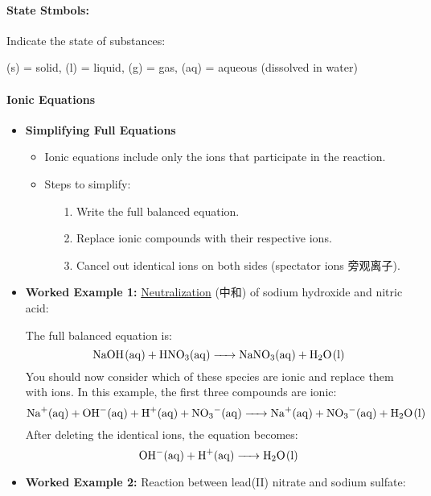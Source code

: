 \paragraph{State Stmbols:} Indicate the state of substances:
\begin{center}
    (s) = solid, (l) = liquid, (g) = gas, (aq) = aqueous (dissolved in water)
\end{center}

\paragraph{Ionic Equations}
\begin{itemize}
    \item \textbf{Simplifying Full Equations}
    \begin{itemize}
        \item Ionic equations include only the ions that participate in the reaction.
        \item Steps to simplify:
        \begin{itemize}
            \item[1.] Write the full balanced equation.
            \item[2.] Replace ionic compounds with their respective ions.
            \item[3.] Cancel out identical ions on both sides (spectator ions 旁观离子).
        \end{itemize}
    \end{itemize}
    \item \textbf{Worked Example 1:} \underline{Neutralization} (中和) of sodium hydroxide and nitric acid:\par
    The full balanced equation is:
    \begin{equation}
        \ce{NaOH(aq) + HNO3(aq) -> NaNO3(aq) + H2O(l)}
    \end{equation}
    You should now consider which of these species are ionic and replace them with ions. In this example, the first three
    compounds are ionic:
    \begin{equation}
        \ce{Na+(aq) + OH-(aq) + H+(aq) + NO3-(aq) -> Na+(aq) + NO3-(aq) + H2O(l)}
    \end{equation}
    After deleting the identical ions, the equation becomes:
    \begin{equation}
        \ce{OH-(aq) + H+(aq) -> H2O(l)}
    \end{equation}
    \item \textbf{Worked Example 2:} Reaction between lead(II) nitrate and sodium sulfate:\par

\end{itemize}
